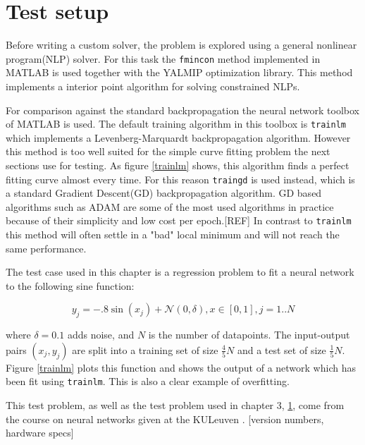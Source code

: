 \section{Test setup}
Before writing a custom solver, the problem is explored using a general nonlinear program(NLP) solver. For this task the \texttt{fmincon} method implemented in MATLAB is used together with the YALMIP optimization library. This method implements a interior point algorithm for solving constrained NLPs. 

For comparison against the standard backpropagation the neural network toolbox of MATLAB is used. The default training algorithm in this toolbox is \texttt{trainlm} which implements a Levenberg-Marquardt backpropagation algorithm. However this method is too well suited for the simple curve fitting problem the next sections use for testing. As figure \ref{trainlm} shows, this algorithm finds a perfect fitting curve almost every time. For this reason \texttt{traingd} is used instead, which is a standard Gradient Descent(GD) backpropagation algorithm. GD based algorithms such as ADAM are some of the most used algorithms in practice because of their simplicity and low cost per epoch.[REF] In contrast to \texttt{trainlm} this method will often settle in a "bad" local minimum and will not reach the same performance.

The test case used in this chapter is a regression problem to fit a neural network to the following sine function:

\begin{equation}
y_j = -.8\sin(x_j) + \mathcal N(0,\delta), x \in [0,1], j = 1..N
\label{sin}
\end{equation}

where $\delta=0.1$ adds noise, and $N$ is the number of datapoints. The input-output pairs $(x_j,y_j)$ are split into a training set of size $\frac{4}{5}N$ and a test set of size $\frac{1}{5}N$. Figure \ref{trainlm} plots this function and shows the output of a network which has been fit using \texttt{trainlm}. This is also a clear example of overfitting.

This test problem, as well as the test problem used in chapter 3, \ref{}, come from the course on neural networks given at the KULeuven \cite{}. [version numbers, hardware specs]

